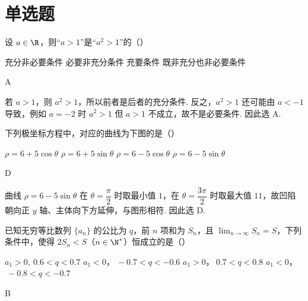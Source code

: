 \section{单选题}

\begin{problem}
设 \(a\in\R\)，则“\(a>1\)”是“\(a^2>1\)”的（\quad）

\choices
    {充分非必要条件}
    {必要非充分条件}
    {充要条件}
    {既非充分也非必要条件}
\end{problem}

\begin{answer}
A
\end{answer}

\begin{solution}
若 \(a>1\)，则 \(a^2>1\)，所以前者是后者的充分条件. 反之，\(a^2>1\) 还可能由 \(a<-1\) 导致，例如 \(a=-2\) 时 \(a^2>1\) 但 \(a>1\) 不成立，故不是必要条件. 因此选 A.
\end{solution}

\begin{problem}
下列极坐标方程中，对应的曲线为下图的是（\quad）


\choices
    {\(\rho=6+5\cos\theta\)}
    {\(\rho=6+5\sin\theta\)}
    {\(\rho=6-5\cos\theta\)}
    {\(\rho=6-5\sin\theta\)}
\end{problem}

\begin{answer}
D
\end{answer}

\begin{solution}
曲线 \(\rho=6-5\sin\theta\) 在 \(\theta=\dfrac\pi2\) 时取最小值 \(1\)，在 \(\theta=\dfrac{3\pi}2\) 时取最大值 \(11\)，故凹陷朝向正 \(y\) 轴、主体向下方延伸，与图形相符. 因此选 D.
\end{solution}

\begin{problem}
已知无穷等比数列 \(\{a_n\}\) 的公比为 \(q\)，前 \(n\) 项和为 \(S_n\)，且 \(\displaystyle\lim_{n\to\infty}S_n=S\)，下列条件中，使得 \(2S_n<S\)（\(n\in\N^*\)）恒成立的是（\quad）

\choices
    {\(a_1>0,\ 0.6<q<0.7\)}
    {\(a_1<0\)，\(\ -0.7<q<-0.6\)}
    {\(a_1>0\)，\(\ 0.7<q<0.8\)}
    {\(a_1<0\)，\(\ -0.8<q<-0.7\)}
\end{problem}

\begin{answer}
B
\end{answer}

